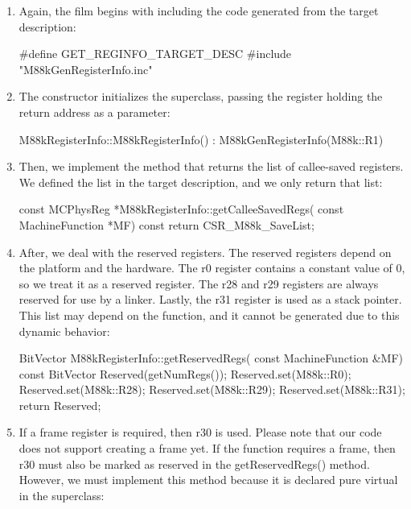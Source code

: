 \begin{enumerate}
\item
Again, the film begins with including the code generated from the target description:

\begin{cpp}
#define GET_REGINFO_TARGET_DESC
#include "M88kGenRegisterInfo.inc"
\end{cpp}

\item
The constructor initializes the superclass, passing the register holding the return address as a parameter:

\begin{cpp}
M88kRegisterInfo::M88kRegisterInfo()
    : M88kGenRegisterInfo(M88k::R1) {}
\end{cpp}

\item
Then, we implement the method that returns the list of callee-saved registers. We defined the list in the target description, and we only return that list:

\begin{cpp}
const MCPhysReg *M88kRegisterInfo::getCalleeSavedRegs(
        const MachineFunction *MF) const {
    return CSR_M88k_SaveList;
}
\end{cpp}

\item
After, we deal with the reserved registers. The reserved registers depend on the platform and the hardware. The r0 register contains a constant value of 0, so we treat it as a reserved register. The r28 and r29 registers are always reserved for use by a linker. Lastly, the r31 register is used as a stack pointer. This list may depend on the function, and it cannot be generated due to this dynamic behavior:

\begin{cpp}
BitVector M88kRegisterInfo::getReservedRegs(
        const MachineFunction &MF) const {
    BitVector Reserved(getNumRegs());
    Reserved.set(M88k::R0);
    Reserved.set(M88k::R28);
    Reserved.set(M88k::R29);
    Reserved.set(M88k::R31);
    return Reserved;
}
\end{cpp}

\item
If a frame register is required, then r30 is used. Please note that our code does not support creating a frame yet. If the function requires a frame, then r30 must also be marked as reserved in the getReservedRegs() method. However, we must implement this method because it is declared pure virtual in the superclass:


\end{enumerate}
